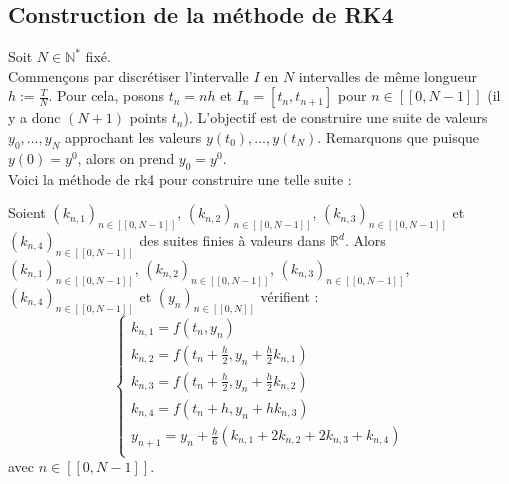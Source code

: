 \documentclass[9pt,a4paper]{article}
\begin{document}
\subsection{Construction de la méthode de RK4}
Soit $N \in \mathbb{N}^*$ fixé. \\
Commençons par discrétiser l'intervalle $I$ en $N$ intervalles de même longueur $h := \frac{T}{N}$. Pour cela, posons $t_n = nh$ et $I_n = [t_n, t_{n + 1}]$ pour $n \in [\![0, N - 1]\!]$ (il y a donc $(N+1)$ points $t_n$). L'objectif est de construire une suite de valeurs $y_0, ..., y_N$ approchant les valeurs $y(t_0), ..., y(t_N)$. Remarquons que puisque $y(0) = y^0$, alors on prend $y_0 = y^0$. \\
Voici la méthode de \gls{rk4} pour construire une telle suite : \\
\begin{tcolorbox}[colback=green!5!white, colframe=green!50!black, title = Méthode de \gls{rk4}]
Soient $(k_{n, 1})_{n \in [\![0, N - 1]\!]}$, $(k_{n, 2})_{n \in [\![0, N - 1]\!]}$, $(k_{n, 3})_{n \in [\![0, N - 1]\!]}$ et $(k_{n, 4})_{n \in [\![0, N - 1]\!]}$ des suites finies à valeurs dans $\mathbb{R}^d$. Alors $(k_{n, 1})_{n \in [\![0, N - 1]\!]}$, $(k_{n, 2})_{n \in [\![0, N - 1]\!]}$, $(k_{n, 3})_{n \in [\![0, N - 1]\!]}$, $(k_{n, 4})_{n \in [\![0, N - 1]\!]}$ et $(y_n)_{n \in [\![0, N]\!]}$ vérifient : \\
$$
\left\{
  \begin{array}{lcl}
    k_{n, 1} = f(t_n, y_n) \\
    k_{n, 2} = f(t_n + \frac{h}{2}, y_n + \frac{h}{2}k_{n, 1}) \\
    k_{n, 3} = f(t_n + \frac{h}{2}, y_n + \frac{h}{2}k_{n, 2}) \\
    k_{n, 4} = f(t_n + h, y_n + hk_{n, 3}) \\
    y_{n + 1} = y_n + \frac{h}{6}(k_{n, 1} + 2k_{n, 2} + 2k_{n, 3} + k_{n, 4}) \\
  \end{array}
\right.
$$
avec $n \in [\![0, N - 1]\!]$.
\end{tcolorbox}
\end{document}
